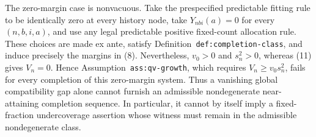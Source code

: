 The zero-margin case is nonvacuous.  Take the prespecified predictable fitting rule to be identically zero at every history node, take \(Y_{nbi}(a)=0\) for every \((n,b,i,a)\), and use any legal predictable positive fixed-count allocation rule.  These choices are made ex ante, satisfy Definition~\texttt{def:completion-class}, and induce precisely the margins in (8).  Nevertheless, \(v_0>0\) and \(s_n^2>0\), whereas (11) gives \(V_n=0\).  Hence Assumption~\texttt{ass:qv-growth}, which requires \(V_n\ge v_0s_n^2\), fails for every completion of this zero-margin system.  Thus a vanishing global compatibility gap alone cannot furnish an admissible nondegenerate near-attaining completion sequence.  In particular, it cannot by itself imply a fixed-fraction undercoverage assertion whose witness must remain in the admissible nondegenerate class.